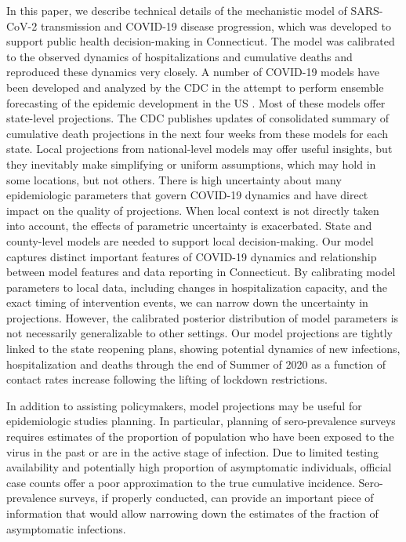 \documentclass[11pt]{article}
\newcommand{\comments}[1]{[\textcolor{red}{#1}]}
\begin{document}


In this paper, we describe technical details of the mechanistic model of SARS-CoV-2 transmission and COVID-19 disease progression, which was developed to support public health decision-making in Connecticut. 
The model was calibrated to the observed dynamics of hospitalizations and cumulative deaths and reproduced these dynamics very closely. 
A number of COVID-19 models have been developed and analyzed by the CDC in the attempt to perform ensemble forecasting of the epidemic development in the US \citep{cdc2020covid19forecasts}. Most of these models offer state-level projections. The CDC publishes updates of consolidated summary of cumulative death projections in the next four weeks from these models for each state. Local projections from national-level models may offer useful insights, but they inevitably make simplifying or uniform assumptions, which may hold in some locations, but not others. 
There is high uncertainty about many epidemiologic parameters that govern COVID-19 dynamics and have direct impact on the quality of projections. When local context is not directly taken into account, the effects of parametric uncertainty is exacerbated.
State and county-level models are needed to support local decision-making.  
Our model captures distinct important features of COVID-19 dynamics and relationship between model features and data reporting in Connecticut. 
By calibrating model parameters to local data, including changes in hospitalization capacity, and the exact timing of intervention events, we can narrow down the uncertainty in projections. However, the calibrated posterior distribution of model parameters is not necessarily generalizable to other settings.
Our model projections are tightly linked to the state reopening plans, showing potential dynamics of new infections, hospitalization and deaths through the end of Summer of 2020 as a function of contact rates increase following the lifting of lockdown restrictions. 

In addition to assisting policymakers, model projections may be useful for epidemiologic studies planning. In particular, planning of sero-prevalence surveys requires estimates of the proportion of population who have been exposed to the virus in the past or are in the active stage of infection. Due to limited testing availability and potentially high proportion of asymptomatic individuals, official case counts offer a poor approximation to the true cumulative incidence. Sero-prevalence surveys, if properly conducted, can provide an important piece of information that would allow narrowing down the estimates of the fraction of asymptomatic infections. 
\end{document}

